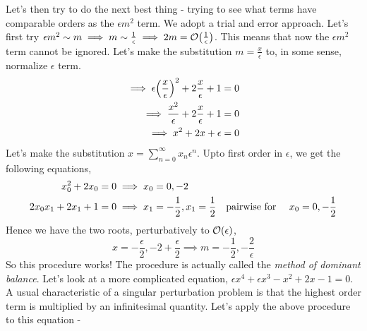 \documentclass[a4paper,11pt]{article}
\begin{document}
Let's then try to do the next best thing - trying to see what terms have comparable orders as the $ \epsilon m^2 $ term. We adopt a trial and error approach. Let's first try $ \epsilon m^2 \sim m \implies m \sim \frac{1}{\epsilon} \implies 2m  = \order{\frac{1}{\epsilon}} $. This means that now the $ \epsilon m^2 $ term cannot be ignored. Let's make the substitution $ m = \frac{x}{\epsilon}$ to, in some sense, normalize $ \epsilon  $ term.
\begin{align*}
\implies \epsilon \qty(\dfrac{x}{\epsilon})^2 + 2 \dfrac{x}{\epsilon} + 1 = 0 \\
\implies \dfrac{x^2}{\epsilon} + 2 \dfrac{x}{\epsilon} + 1 = 0 \\
\implies x^2 + 2 x + \epsilon = 0
\end{align*}
Let's make the substitution $  x = \sum_{n=0}^{\infty} x_n \epsilon^n$. Upto first order in $ \epsilon $, we get the following equations,
\begin{align*}
x_0^2 + 2 x_0 = 0 &\implies x_0 = 0 , -2 \\
2 x_0 x_1 + 2 x_1 + 1 = 0 &\implies x_1 = -\dfrac{1}{2}, x_1 = \dfrac{1}{2} \qq{pairwise for } x_0= 0 , -\frac{1}{2}
\end{align*}
Hence we have the two roots, perturbatively to $ \order{\epsilon} $,
\begin{equation*}
x = -\dfrac{\epsilon}{2}, -2 + \dfrac{\epsilon}{2} \implies m = -\dfrac{1}{2}, -\dfrac{2}{\epsilon}
\end{equation*}
So this procedure works! The procedure is actually called the \textit{method of dominant balance}. Let's look at a more complicated equation, $ \epsilon x^4 + \epsilon x^3 - x^2 + 2x - 1 =0 $. A usual characteristic of a singular perturbation problem is that the highest order term is multiplied by an infinitesimal quantity. Let's apply the above procedure to this equation -
\end{document}
